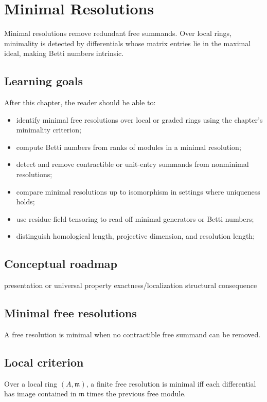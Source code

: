 \chapter{Minimal Resolutions}
\label{ch:v25}

Minimal resolutions remove redundant free summands. Over local rings, minimality is detected by differentials whose matrix entries lie in the maximal ideal, making Betti numbers intrinsic.

\section*{Learning goals}
After this chapter, the reader should be able to:
\begin{itemize}
\item identify minimal free resolutions over local or graded rings using the chapter's minimality criterion;
\item compute Betti numbers from ranks of modules in a minimal resolution;
\item detect and remove contractible or unit-entry summands from nonminimal resolutions;
\item compare minimal resolutions up to isomorphism in settings where uniqueness holds;
\item use residue-field tensoring to read off minimal generators or Betti numbers;
\item distinguish homological length, projective dimension, and resolution length;
\end{itemize}
\section*{Conceptual roadmap}
\volroadmap
  {presentation or universal property}
  {exactness/localization}
  {structural consequence}

\section{Minimal free resolutions}
A free resolution is minimal when no contractible free summand can be removed.

\section{Local criterion}
Over a local ring $(A,\mathfrak m)$, a finite free resolution is minimal iff each differential has image contained in $\mathfrak m$ times the previous free module.

